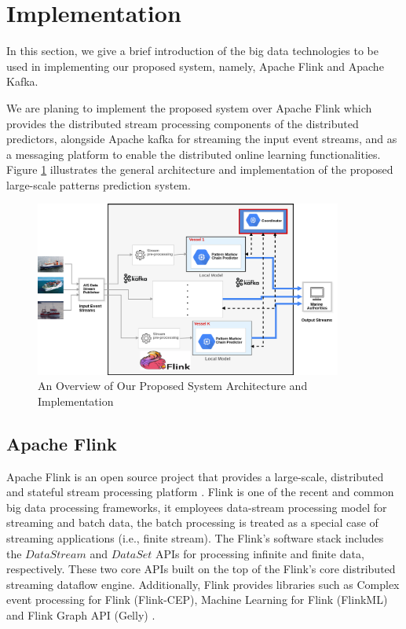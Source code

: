 
\section{Implementation}

In this section, we give a brief introduction of the big data technologies to be used in implementing 
our proposed system, namely, Apache Flink and Apache Kafka.  

We are planing to implement the proposed system over Apache Flink which provides the distributed stream processing components of the distributed predictors, alongside  Apache kafka for streaming the input event streams, and as a messaging platform to enable the distributed online learning functionalities. Figure \ref{fig:system_arch} illustrates the general architecture and implementation of the proposed large-scale patterns prediction system.

\begin{figure}[!ht]
	\begin{centering}
		
		\includegraphics[width=0.9\textwidth]{figures/architecturedist.png}	
		
		\caption{An Overview of Our Proposed System Architecture and  Implementation}  
		\label{fig:system_arch}
	\end{centering}
\end{figure} 

\subsection{Apache Flink}
 Apache Flink is an open source project that provides a large-scale, distributed and stateful stream processing platform \cite{carbone2015apache}. Flink is one of the recent and common big data processing frameworks, it employees data-stream processing model for streaming and batch data, the batch processing is treated as a special case of streaming applications (i.e., finite stream). The Flink's software stack includes the  $DataStream$ and $DataSet$ APIs for processing infinite and finite data, respectively. These two core APIs built on the top of the Flink's core distributed streaming dataflow engine. Additionally, Flink provides libraries such as Complex event processing for Flink (Flink-CEP), Machine Learning for Flink (FlinkML) and Flink Graph API (Gelly) \cite{carbone2015apache}.
 
